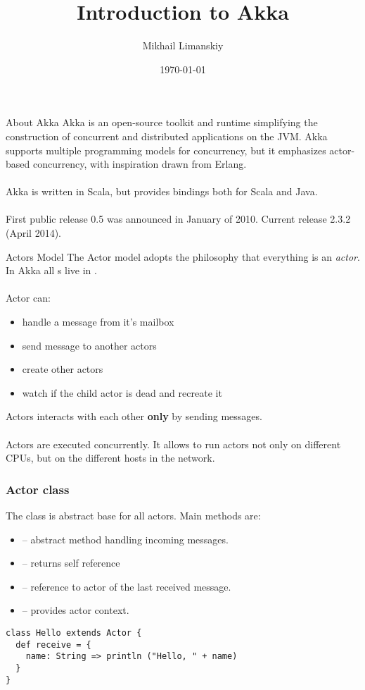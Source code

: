 \documentclass{beamer}
\title{Introduction to Akka}
\author{Mikhail Limanskiy}
\institute{SymphonyTeleca}
\date{\today}
\newcommand\strong\textbf
\begin{document}
\begin{frame}
    \titlepage
\end{frame}

\begin{frame}{About Akka}
Akka is an open-source toolkit and runtime simplifying the construction of concurrent
and distributed applications on the JVM. Akka supports multiple programming models
for concurrency, but it emphasizes actor-based concurrency, with inspiration drawn from Erlang.\\~\\

Akka is written in Scala, but provides bindings both for Scala and Java.\\~\\

First public release 0.5 was announced in January of 2010. Current release 2.3.2 (April 2014).
\end{frame}

\begin{frame}{Actors Model}
The Actor model adopts the philosophy that everything is an \emph{actor}.  In Akka all s
live in .\\~\\

Actor can:
\begin{itemize}
\item handle a message from it's mailbox
\item send message to another actors
\item create other actors
\item watch if the child actor is dead and recreate it
\end{itemize}
Actors interacts with each other \strong{only} by sending messages.\\~\\

Actors are executed concurrently.  It allows to run actors not only on different CPUs, but on the
different hosts in the network.
\end{frame}

\begin{frame}[fragile]
\frametitle{Actor class}
The  class is abstract base for all actors. Main methods are:
\begin{itemize}
  \item {} -- abstract method handling incoming messages.
  \item {} -- returns self reference
  \item {} -- reference to actor of the last received message.
  \item {} -- provides actor context.
\end{itemize}
\begin{lstlisting}
class Hello extends Actor {
  def receive = {
    name: String => println ("Hello, " + name)
  }
}
\end{lstlisting}
\end{frame}
\end{document}
